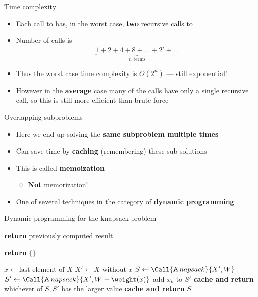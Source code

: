 \begin{frame}{Time complexity}
	\begin{itemize}
		\pause\item Each call to  has, in the worst case, \textbf{two} recursive calls to 
		\pause\item Number of calls is
			$$ \underbrace{1 + 2 + 4 + 8 + \dots + 2^i + \dots}_{\text{$n$ terms}} $$
		\pause\item Thus the worst case time complexity is $O(2^n)$ --- still exponential!
		\pause\item However in the \textbf{average} case many of the calls have only a single recursive call,
			so this is still more efficient than brute force
	\end{itemize}
\end{frame}

\begin{frame}{Overlapping subproblems}
	\begin{itemize}
		\pause\item Here we end up solving the \textbf{same subproblem multiple times}
		\pause\item Can save time by \textbf{caching} (remembering) these sub-solutions
		\pause\item This is called \textbf{memoization}
			\begin{itemize}
				\pause\item \textbf{Not} memo\underline{r}ization!
			\end{itemize}
		\pause\item One of several techniques in the category of \textbf{dynamic programming}
	\end{itemize}
\end{frame}

\begin{frame}{Dynamic programming for the knapsack problem}
    \footnotesize
	\begin{algorithmic}
			 \pause
				\State \textbf{return} previously computed result
			\EndIf \pause
			
				\State \textbf{return} $\{\}$
			\EndIf 

			\State $x \gets \text{last element of $X$}$ 
			\State $X' \gets X \text{ without } x$ 
			\State $S \gets \Call{Knapsack}{X', W}$ 
				\State $S' \gets \Call{Knapsack}{X', W - \weight(x)}$
				\State add $x_k$ to $S'$ 
				\State \textbf{cache and return} whichever of $S,S'$ has the larger value
			\Else
				\State \textbf{cache and return} $S$
			\EndIf
		\EndProcedure
	\end{algorithmic}
\end{frame}


